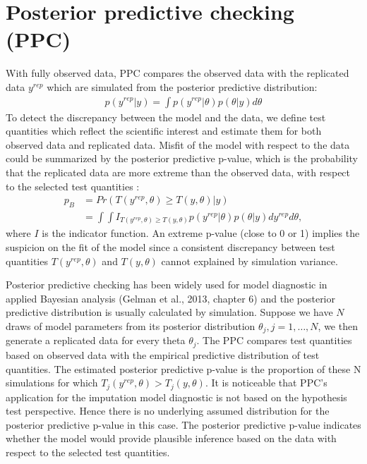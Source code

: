 \documentclass[12pt, fullpage, a4paper]{article}
\begin{document}
\section{Posterior predictive checking (PPC)}
With fully observed data, PPC compares the observed data with the replicated data $y^{rep}$ which are simulated from the posterior predictive distribution:
\begin{equation}
\begin{array}{ll}
p(y^{rep}|y) = \int p(y^{rep}|\theta)p(\theta|y)d\theta
\end{array} 
\end{equation}
To detect the discrepancy between the model and the data, we define test quantities which reflect the scientific interest and estimate them for both observed data and replicated data. Misfit of the model with respect to the data could be summarized by the posterior predictive p-value, which is the probability that the replicated data are more extreme than the observed data, with respect to the selected test quantities \cite{gelman2013bayesian}:
\begin{equation}
\begin{array}{ll}
p_{B} &= Pr(T(y^{rep}, \theta) \ge T(y, \theta)|y)\\
&= \int\int I_{T(y^{rep}, \theta) \ge T(y, \theta)}p(y^{rep}|\theta)p(\theta|y)dy^{rep}d\theta,
\end{array} 
\end{equation}
where $I$ is the indicator function. An extreme p-value (close to 0 or 1) implies the suspicion on the fit of the model since a consistent discrepancy between test quantities $T(y^{rep}, \theta)$ and $T(y, \theta)$ cannot explained by simulation variance. 

Posterior predictive checking has been widely used for model diagnostic in applied Bayesian analysis (Gelman et al., 2013, chapter 6) and the posterior predictive distribution is usually calculated by simulation. Suppose we have $N$ draws of model parameters from its posterior distribution $\theta_j, j=1,\dots,N$, we then generate a replicated data for every theta $\theta_j$. The PPC compares test quantities based on observed data with the empirical predictive distribution of test quantities. The estimated posterior predictive p-value is the proportion of these N simulations for which $T_{j}(y^{rep}, \theta) > T_{j}(y, \theta)$. It is noticeable that PPC's application for the imputation model diagnostic is not based on the hypothesis test perspective. Hence there is no underlying assumed distribution for the posterior predictive p-value in this case. The posterior predictive p-value indicates whether the model would provide plausible inference based on the data with respect to the selected test quantities. 
\end{document}
